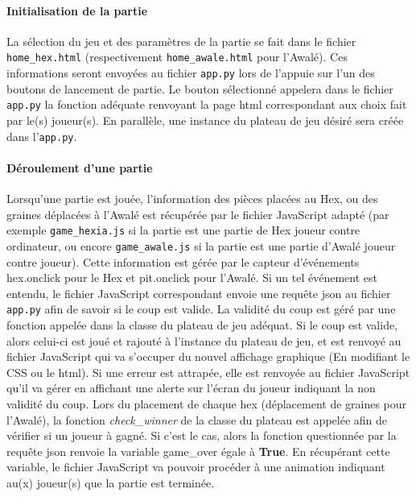 \paragraph{Initialisation de la partie}
La sélection du jeu et des paramètres de la partie se fait dans le fichier \texttt{home\_hex.html}
(respectivement \texttt{home\_awale.html} pour l'Awalé). Ces informations seront envoyées au fichier \texttt{app.py}
lors de l'appuie sur l'un des boutons de lancement de partie. Le bouton sélectionné appelera dans le fichier \texttt{app.py} la 
fonction adéquate renvoyant la page html correspondant aux choix fait par le(s) joueur(s). En parallèle, une instance du plateau de
jeu désiré sera créée dans l'\texttt{app.py}. 

\paragraph{Déroulement d'une partie}
Lorsqu'une partie est jouée, l'information des pièces placées au Hex, ou des graines déplacées à l'Awalé est récupérée par
le fichier JavaScript adapté (par exemple \texttt{game\_hexia.js} si la partie est une partie de Hex joueur contre ordinateur, ou encore 
\texttt{game\_awale.js} si la partie est une partie d'Awalé joueur contre joueur). Cette information est gérée par le capteur d'événements
hex.onclick pour le Hex et pit.onclick pour l'Awalé. Si un tel événement est entendu, le fichier JavaScript correspondant envoie une requête 
json au fichier \texttt{app.py} afin de savoir si le coup est valide. La validité du coup est géré par une fonction appelée dans la classe du
plateau de jeu adéquat. Si le coup est valide, alors celui-ci est joué et rajouté à l'instance du plateau de jeu, et est renvoyé au fichier 
JavaScript qui va s'occuper du nouvel affichage graphique (En modifiant le CSS ou le html). Si une erreur est attrapée, elle est renvoyée
au fichier JavaScript qu'il va gérer en affichant une alerte sur l'écran du joueur indiquant la non validité du coup. Lors du placement de chaque
hex (déplacement de graines pour l'Awalé), la fonction \textit{check\_winner} de la classe du plateau est appelée afin de vérifier si un joueur à 
gagné. Si c'est le cas, alors la fonction questionnée par la requête json renvoie la variable \textsf{game\_over} égale à \textbf{True}. 
En récupérant cette variable, le fichier JavaScript va pouvoir procéder à une animation indiquant au(x) joueur(s) que la partie est terminée.







